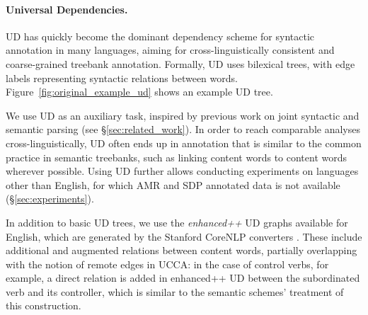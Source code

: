 \documentclass[11pt,a4paper]{article}
\begin{document}
\paragraph{Universal Dependencies.}\label{sec:ud}
UD \cite{nivre2016universal} has quickly become
the dominant dependency scheme for
syntactic  annotation in many languages,
aiming for cross-linguistically consistent and coarse-grained treebank
annotation. Formally, UD uses bilexical trees, with edge labels 
representing syntactic relations between words.
Figure~\ref{fig:original_example_ud} shows an example UD tree.

We use UD as an auxiliary task,
inspired by previous work on joint syntactic and semantic parsing
(see \S\ref{sec:related_work}).
In order to reach comparable analyses cross-linguistically,
UD often ends up in annotation that is similar to the common practice
in semantic treebanks, such as linking content words to content words wherever possible.
Using UD further allows conducting experiments on languages other than English, 
for which AMR and SDP annotated data is not available (\S\ref{sec:experiments}).

In addition to basic UD trees, we use the \textit{enhanced++} UD graphs available for English,
which are generated by the Stanford CoreNLP converters \cite{SCHUSTER16.779}.
These include additional and augmented relations between content words,
partially overlapping with the notion of remote edges in UCCA:
in the case of control verbs, for example, a direct relation is added in 
enhanced++ UD between the subordinated verb and its controller,
which is similar to the semantic schemes' treatment of this construction.
\end{document}

